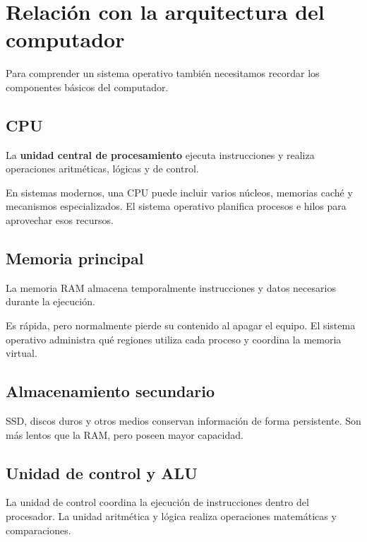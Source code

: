 \documentclass[
  spanish,
  letterpaper,
]{scrbook}
\begin{document}

\chapter{Relación con la arquitectura del
computador}\label{relaciuxf3n-con-la-arquitectura-del-computador}

Para comprender un sistema operativo también necesitamos recordar los
componentes básicos del computador.

\section{CPU}\label{cpu}

La \textbf{unidad central de procesamiento} ejecuta instrucciones y
realiza operaciones aritméticas, lógicas y de control.

En sistemas modernos, una CPU puede incluir varios núcleos, memorias
caché y mecanismos especializados. El sistema operativo planifica
procesos e hilos para aprovechar esos recursos.

\section{Memoria principal}\label{memoria-principal}

La memoria RAM almacena temporalmente instrucciones y datos necesarios
durante la ejecución.

Es rápida, pero normalmente pierde su contenido al apagar el equipo. El
sistema operativo administra qué regiones utiliza cada proceso y
coordina la memoria virtual.

\section{Almacenamiento secundario}\label{almacenamiento-secundario}

SSD, discos duros y otros medios conservan información de forma
persistente. Son más lentos que la RAM, pero poseen mayor capacidad.

\section{Unidad de control y ALU}\label{unidad-de-control-y-alu}

La unidad de control coordina la ejecución de instrucciones dentro del
procesador. La unidad aritmética y lógica realiza operaciones
matemáticas y comparaciones.
\end{document}
